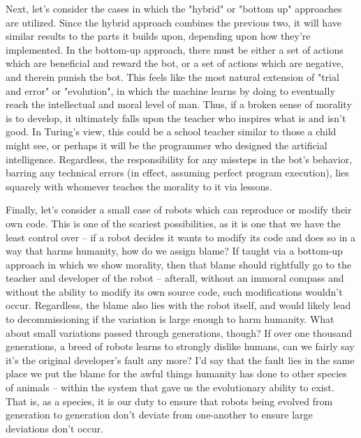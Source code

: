 \documentclass[12]{article}
\begin{document}
		Next, let's consider the cases in which the "hybrid" or "bottom up" approaches\cite{morality} are utilized. Since the hybrid approach combines the previous two, it will have similar results to the parts it builds upon, depending upon how they're implemented. In the bottom-up approach, there must be either a set of actions which are beneficial and reward the bot, or a set of actions which are negative, and therein punish the bot. This feels like the most natural extension of "trial and error" or "evolution", in which the machine learns by doing to eventually reach the intellectual and moral level of man\cite{turing_test}. Thus, if a broken sense of morality is to develop, it ultimately falls upon the teacher who inspires what is and isn't good. In Turing's view, this could be a school teacher similar to those a child might see\cite{turing_test}, or perhaps it will be the programmer who designed the artificial intelligence. Regardless, the responsibility for any missteps in the bot's behavior, barring any technical errors (in effect, assuming perfect program execution), lies squarely with whomever teaches the morality to it via lessons.
		
		Finally, let's consider a small case of robots which can reproduce or modify their own code. This is one of the scariest possibilities, as it is one that we have the least control over -- if a robot decides it wants to modify its code and does so in a way that harms humanity, how do we assign blame? If taught via a bottom-up approach in which we show morality, then that blame should rightfully go to the teacher and developer of the robot -- afterall, without an immoral compass and without the ability to modify its own source code, such modifications wouldn't occur. Regardless, the blame also lies with the robot itself, and would likely lead to decommissioning if the variation is large enough to harm humanity. What about small variations passed through generations, though? If over one thousand generations, a breed of robots learns to strongly dislike humans, can we fairly say it's the original developer's fault any more? I'd say that the fault lies in the same place we put the blame for the awful things humanity has done to other species of animals -- within the system that gave us the evolutionary ability to exist. That is, as a species, it is our duty to ensure that robots being evolved from generation to generation don't deviate from one-another to ensure large deviations don't occur.
\end{document}

